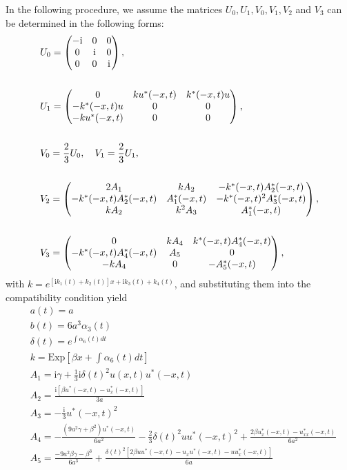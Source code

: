 \documentclass[12pt]{article}
\begin{document}
In the following procedure, we assume the matrices $U_{0}, U_{1}, V_{0}, V_{1}, V_{2}$ and $V_{3}$ can be determined in the following forms:
\begin{align}
  & U_{0} = \begin{pmatrix}
             -\mathrm{i} & 0 & 0 \\
              0 & \mathrm{i} & 0 \\
              0 & 0 & \mathrm{i}
            \end{pmatrix}, \label{4} \\ \notag\\
  & U_{1} = \begin{pmatrix}
              0 & ku^{*}(-x,t) & k^{*}(-x,t)u \\
              -k^{*}(-x,t)u & 0 & 0 \\
              -ku^{*}(-x,t) & 0 & 0
            \end{pmatrix}, \label{5} \\ \notag\\
  & V_{0} = \frac{2}{3}U_{0}, \quad V_{1} = \frac{2}{3}U_{1}, \\ \notag\\
  & V_{2} = \begin{pmatrix}
              2A_{1} & kA_{2} & -k^{*}(-x,t)A_{2}^{*}(-x,t) \\
              -k^{*}(-x,t)A_{2}^{*}(-x,t) & A_{1}^{*}(-x,t) & -k^{*}(-x,t)^{2}A_{3}^{*}(-x,t) \\
              kA_{2} & k^{2}A_{3} & A_{1}^{*}(-x,t)
            \end{pmatrix}, \\ \notag\\
  & V_{3} = \begin{pmatrix}
              0 & kA_{4} & k^{*}(-x,t)A_{4}^{*}(-x,t) \\
              -k^{*}(-x,t)A_{4}^{*}(-x,t) & A_{5} & 0 \\
              -kA_{4} & 0 & -A_{5}^{*}(-x,t)
            \end{pmatrix}, \label{8}
\end{align}
with $k=e^{\left[\mathrm{i}k_{1}(t) + k_2(t)\right]x + \mathrm{i}k_{3}(t) + k_4(t)}$, and substituting them into the compatibility condition yield
\begin{align}
  & a(t) = a \\
  & b(t) = 6a^{3}\alpha_{3}(t) \\
  & \delta(t) = e^{\int \alpha_6(t)dt} \\
  & k =\mathrm{Exp}\left[\beta x + \int \alpha_6(t)dt \right] \\
  & A_{1} =  \mathrm{i}\gamma + \frac{1}{3}\mathrm{i}\delta(t)^2u(x,t)u^*(-x,t) \\
  & A_{2} = \frac{\mathrm{i}\left[\beta u^*(-x,t) - u^*_x(-x,t)\right]}{3a}  \\
  & A_{3} = -\frac{\mathrm{i}}{3}u^{*}(-x,t)^{2}  \\
  & A_{4} = -\frac{(9a^2\gamma+\beta^2)u^*(-x,t)}{6a^2}-\frac{2}{3}\delta(t)^2uu^*(-x,t)^2 +\frac{2\beta u^*_x(-x,t) - u^*_{xx}(-x,t)}{6a^2} \\
  & A_{5} = \frac{-9a^2\beta \gamma - \beta^3}{6a^3} + \frac{\delta(t)^2\left[2\beta uu^*(-x,t) - u_xu^*(-x,t) - uu^*_x(-x,t)\right]}{6a}
\end{align}
\end{document}
